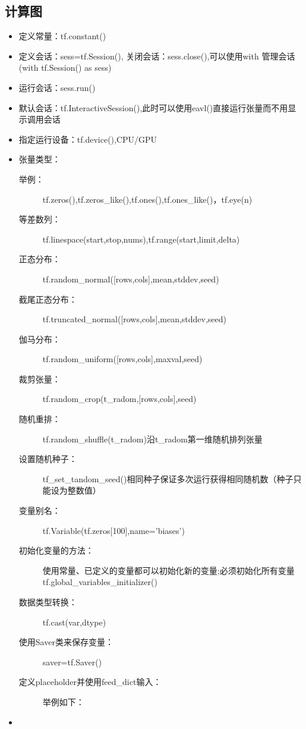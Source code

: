 \documentclass[UTF8]{article}%
\begin{document}
		\subsection{计算图}
			\begin{itemize}
				\item 定义常量：tf.constant()
				\item 定义会话：sess=tf.Session(), 关闭会话：sess.close(),可以使用with 管理会话(with tf.Session() as sess)
				\item 运行会话：sess.run()
				\item 默认会话：tf.InteractiveSession(),此时可以使用eavl()直接运行张量而不用显示调用会话
				\item 指定运行设备：tf.device(),CPU/GPU
				\item 张量类型：
				\begin{description}
					\item[举例：] tf.zeros(),tf.zeros\_like(),tf.ones(),tf.ones\_like()，tf.eye(n)
					\item[等差数列：] tf.linespace(start,stop,nums),tf.range(start,limit,delta)
					\item[正态分布：] tf.random\_normal([rows,cols],mean,stddev,seed)
					\item[截尾正态分布：] tf.truncated\_normal([rows,cols],mean,stddev,seed)
					\item[伽马分布：] tf.random\_uniform([rows,cols],maxval,seed)
					\item[裁剪张量：] tf.random\_crop(t\_radom,[rows,cols],seed)
					\item[随机重排：] tf.random\_shuffle(t\_radom)沿t\_radom第一维随机排列张量
					\item[设置随机种子：] tf\_set\_tandom\_seed()相同种子保证多次运行获得相同随机数（种子只能设为整数值）
					\item[变量别名：] tf.Variable(tf.zeros[100],name='biases')
					\item[初始化变量的方法：] 使用常量、已定义的变量都可以初始化新的变量;必须初始化所有变量 tf.global\_variables\_initializer()
					\item[数据类型转换：] tf.cast(var,dtype)
					\item[使用Saver类来保存变量：]  saver=tf.Saver()
					\item[定义placeholder并使用feed\_dict输入：] 举例如下：
				\end{description}
				\item   	
			\end{itemize}
\end{document}
